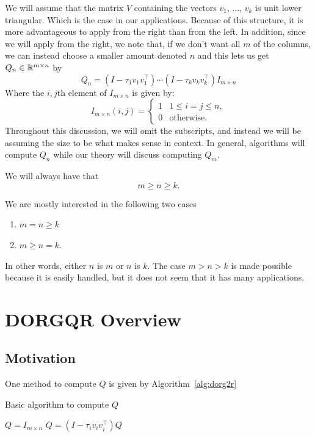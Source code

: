 \documentclass[12pt]{article}
\begin{document}
    We will assume that the matrix $V$ containing the vectors $v_1$, ..., $v_k$ is unit lower triangular. Which is the case in our applications.
    Because of this structure, it is more advantageous to apply from the right than from the left.
    In addition, since we will apply from the right, 
    we note that, if we don't want all $m$ of the columns, we can instead choose a smaller amount denoted $n$ 
    and this lets us get $Q_n\in\mathbb{R}^{m\times n}$ by 
    \begin{equation}\label{eq:Qn}
        Q_n = \left(I - \tau_1 v_1v_1^\top\right)\cdots\left(I - \tau_kv_kv_k^\top\right)I_{m\times n}
    \end{equation}
    Where the $i,j$th element of $I_{m\times n}$ is given by:
    \begin{equation*}
        I_{m\times n}(i,j) = \begin{cases}
            1 & 1\leq i = j\leq n,\\
            0 & \text{otherwise}.
        \end{cases}
    \end{equation*}
    Throughout this discussion, we will omit the subscripts, and instead we will be assuming the size to be 
    what makes sense in context. In general, algorithms will compute $Q_n$ while our theory will discuss computing $Q_m$. 

    We will always have that $$m\geq n\geq k.$$

    We are mostly interested in the following two cases
    \begin{enumerate}
        \item $m=n\geq k$
        \item $m\geq n=k$.
    \end{enumerate}
    In other words, either $n$ is $m$ or $n$ is $k$. The case $m>n>k$ is made possible because it is easily handled, but it does not seem
    that it has many applications.

    \section{DORGQR Overview}

    \subsection{Motivation}

    One method to compute $Q$ is given by Algorithm~\ref{alg:dorg2r}

    \begin{algorithm}
        \caption{Basic algorithm to compute $Q$}\label{alg:dorg2r}
        \begin{algorithmic}[1]
            \STATE $Q= I_{m\times n}$
                \STATE $Q= \left(I-\tau_iv_iv_i^\top\right)Q$
            \ENDFOR
        \end{algorithmic}
    \end{algorithm}
\end{document}
